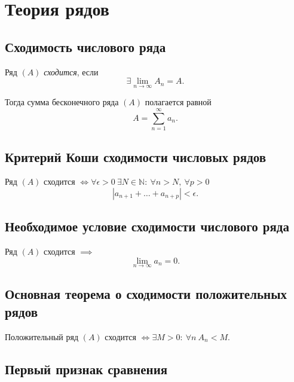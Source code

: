 \section{Теория рядов}

\setcounter{subsection}{20}

\subsection{Сходимость числового ряда}

\begin{definition}
    Ряд $(A)$ \emph{сходится}, если
    \[
        \exists \underset{n\rightarrow\infty}{\lim}A_n = A.
    \]

    Тогда сумма бесконечного ряда $(A)$ полагается равной
    \[
        A = \sum_{n=1}^{\infty}a_n.
    \]
\end{definition}

\subsection{Критерий Коши сходимости числовых рядов}

\begin{theorem}
    Ряд $(A)$ сходится $\iff \forall \epsilon > 0 \ \exists N \in \mathbb{N}: \ \forall n > N, \ \forall p > 0$
    \[
        |a_{n+1} + \ldots + a_{n+p}| < \epsilon.
    \]
\end{theorem}

\subsection{Необходимое условие сходимости числового ряда}

\begin{theorem}
    Ряд $(A)$ сходится $ \implies $
    \[
        \underset{n\rightarrow\infty}{\lim}a_n = 0.
    \]
\end{theorem}

\subsection{Основная теорема о сходимости положительных рядов}

\begin{theorem}\label{theorem:2.1}
    Положительный ряд $ (A) $ сходится $ \iff \exists M > 0: \ \forall n \ A_n < M $.
\end{theorem}

\subsection{Первый признак сравнения}

